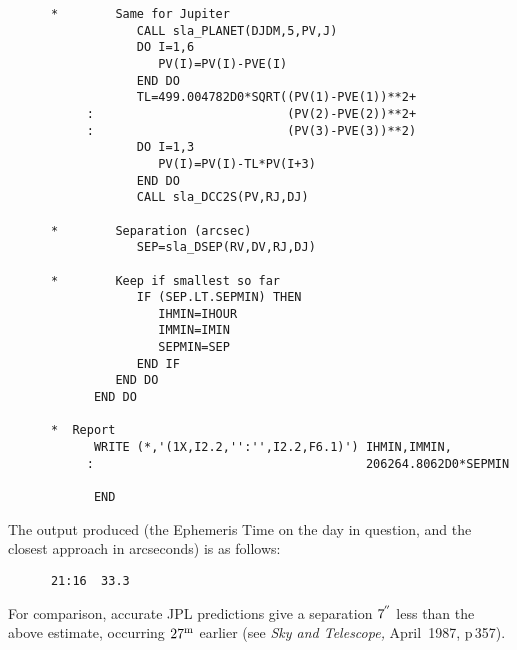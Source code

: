 \documentclass[11pt,twoside]{article}
\newcommand{\arcseci}[1] {$#1\hspace{-0.05em}$\raisebox{-0.5ex}
                         {$^{'\hspace{-0.1em}'}$}}
\renewcommand{\arcseci}[1] {$#1\hspace{-0.05em}^{'\hspace{-0.1em}'}$}
\begin{document}
\begin{verbatim}
      *        Same for Jupiter
                  CALL sla_PLANET(DJDM,5,PV,J)
                  DO I=1,6
                     PV(I)=PV(I)-PVE(I)
                  END DO
                  TL=499.004782D0*SQRT((PV(1)-PVE(1))**2+
           :                           (PV(2)-PVE(2))**2+
           :                           (PV(3)-PVE(3))**2)
                  DO I=1,3
                     PV(I)=PV(I)-TL*PV(I+3)
                  END DO
                  CALL sla_DCC2S(PV,RJ,DJ)

      *        Separation (arcsec)
                  SEP=sla_DSEP(RV,DV,RJ,DJ)

      *        Keep if smallest so far
                  IF (SEP.LT.SEPMIN) THEN
                     IHMIN=IHOUR
                     IMMIN=IMIN
                     SEPMIN=SEP
                  END IF
               END DO
            END DO

      *  Report
            WRITE (*,'(1X,I2.2,'':'',I2.2,F6.1)') IHMIN,IMMIN,
           :                                      206264.8062D0*SEPMIN

            END
\end{verbatim}
\goodbreak
The output produced (the Ephemeris Time on the day in question, and
the closest approach in arcseconds) is as follows:
\goodbreak
\begin{verbatim}
      21:16  33.3
\end{verbatim}
\goodbreak
For comparison, accurate JPL predictions
give a separation \arcseci{7} less than
the above estimate, occurring $27^{\rm m}$ earlier
(see {\it Sky and Telescope,}\/ April~1987, p\,357).
\end{document}
